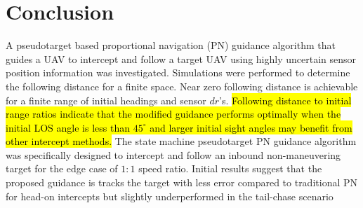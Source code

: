 \documentclass[conference]{IEEEtran}
\begin{document}
\section{Conclusion}





A pseudotarget based proportional navigation (PN) guidance algorithm that guides a UAV to intercept and follow a target UAV using highly uncertain sensor position information was investigated. Simulations were performed to determine the following distance for a finite space. Near zero following distance is achievable for a finite range of initial headings and sensor $dr$'s. \hl{Following distance to initial range ratios indicate that the modified guidance performs optimally when the initial LOS angle is less than $45^\circ$ and larger initial sight angles may benefit from other intercept methods.} The state machine pseudotarget PN guidance algorithm was specifically designed to intercept and follow an inbound non-maneuvering target for the edge case of $1:1$ speed ratio. Initial results suggest that the proposed guidance is tracks the target with less error compared to traditional PN for head-on intercepts but slightly underperformed in the tail-chase scenario 
\end{document}
